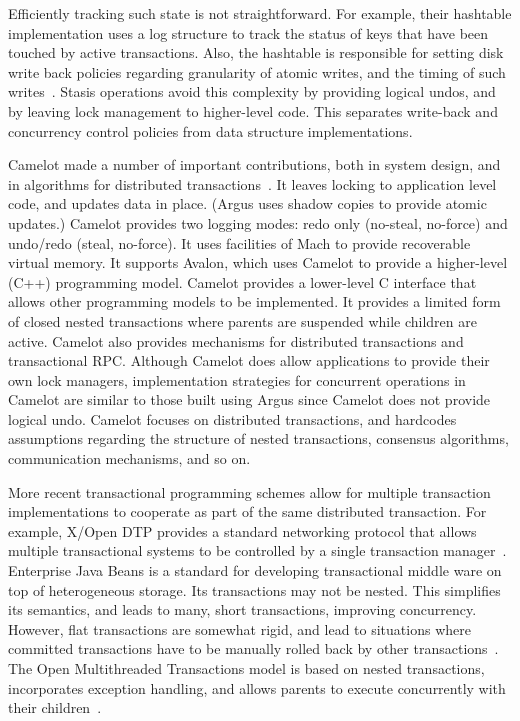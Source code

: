 \documentclass[letterpaper,twocolumn,10pt]{article}
\newcommand{\yad}{Stasis\xspace}
\begin{document}
Efficiently
tracking such state is not straightforward.  For example, their
hashtable implementation uses a log structure to
track the status of keys that have been touched by 
active transactions.  Also, the hashtable is responsible for setting disk write back
policies regarding granularity of atomic writes, and the timing of such writes~\cite{argusImplementation}.  \yad operations avoid this
complexity by providing logical undos, and by leaving lock management
to higher-level code.  This separates write-back and concurrency
control policies from data structure implementations.

Camelot made a number of important
contributions, both in system design, and in algorithms for
distributed transactions~\cite{camelot}.  It leaves locking to application level code,
and updates data in place.  (Argus uses shadow copies to provide
atomic updates.)  Camelot provides two logging modes: redo only
(no-steal, no-force) and undo/redo (steal, no-force).  It uses 
facilities of Mach to provide recoverable virtual memory.  It
supports Avalon, which uses Camelot to provide a
higher-level (C++) programming model.  Camelot provides a lower-level
C interface that allows other programming models to be
implemented.  It provides a limited form of closed nested transactions
where parents are suspended while children are active.  Camelot also
provides mechanisms for distributed transactions and transactional
RPC.  Although Camelot does allow applications to provide their own lock 
managers, implementation strategies for concurrent operations 
in Camelot are similar to those
built using Argus since Camelot does not provide logical undo.  Camelot focuses
on distributed transactions, and hardcodes
assumptions regarding the structure of nested transactions, consensus
algorithms, communication mechanisms, and so on.

More recent transactional programming schemes allow for multiple
transaction implementations to cooperate as part of the same
distributed transaction.  For example, X/Open DTP provides a standard
networking protocol that allows multiple transactional systems to be
controlled by a single transaction manager~\cite{dtp}.
Enterprise Java Beans is a standard for developing transactional
middle ware on top of heterogeneous storage.  Its
transactions may not be nested.  This simplifies its
semantics, and leads to many, short transactions, 
improving concurrency.  However, flat transactions are somewhat rigid, and lead to
situations where committed transactions have to be manually rolled
back by other transactions~\cite{ejbCritique}.  The Open
Multithreaded Transactions model is based on nested transactions,
incorporates exception handling, and allows parents to execute
concurrently with their children~\cite{omtt}.
\end{document}
